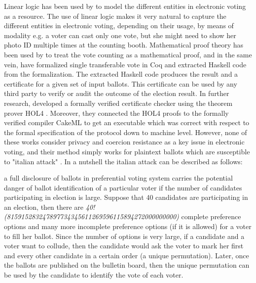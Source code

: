  \noindent
 Linear logic \citep{GIRARD19871} has been used by \citep{DeYoung:2012:LLV} to model the different entities in electronic voting as a resource. 
 The use of linear logic makes it very natural to capture the different entities in electronic voting,  
 depending on their usage, by means of modality e.g. a voter can cast only one vote, but she might 
 need to show her photo ID multiple times at the counting booth. Mathematical proof theory has 
 been used by \citep{Pattinson:2015:VCM}  to treat the vote counting as a mathematical 
 proof, and in the same vein, 
 \citep{Ghale:2017:FVS} have formalized single transferable vote in Coq and 
 extracted Haskell code from the formalization. The extracted Haskell code produces the result 
 and a certificate for a given set of input ballots. This certificate can be used by any third party to verify 
 or audit the outcome of the election result.  In further research, \citep{10.1007/978-3-030-03592-1_5} 
 developed a formally verified certificate checker using the theorem prover HOL4 \citep{Slind:2008:BOH:1459784.1459792}. 
 Moreover, they connected the HOL4 proofs to the formally verified compiler CakeML \citep{Kumar:2014:CVI} 
 to get an executable which was correct with respect to the formal specification of the protocol
 down to machine level. 
 However, none of these works consider privacy and coercion resistance as a key 
 issue in electronic voting, and their method simply works for plaintext ballots which are  susceptible to 
 "italian attack"  \citep{Otten}   \citep{Benaloh:2009:SSC}.  In a nutshell the italian attack can be described 
 as follows: 
 \begin{displayquote}
 a full disclosure of 
 ballots in preferential voting system carries the potential danger of  ballot identification of 
 a particular voter if the number of candidates participating in election is large. Suppose
 that 40 candidates are participating in an election, then there are \textit{40!
 (815915283247897734345611269596115894272000000000)} complete 
 preference options and many more incomplete  preference options  (if it is allowed) for a voter to 
 fill her ballot. Since the number of options is very large, if a candidate and a voter want 
 to collude, then the candidate would ask the voter to mark her first and every other candidate 
 in a certain order (a unique permutation). Later, once the ballots are published 
 on the bulletin board, then the unique permutation can be used by the candidate to 
 identify the vote of each voter.  
 \end{displayquote}
 

